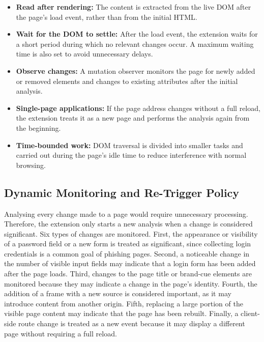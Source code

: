\documentclass{FastFyp}
\begin{document}
\begin{itemize}
    \item \textbf{Read after rendering:} The content is extracted from the live DOM after the page's load event, rather than from the initial HTML.

    \item \textbf{Wait for the DOM to settle:} After the load event, the extension waits for a short period during which no relevant changes occur. A maximum waiting time is also set to avoid unnecessary delays.

    \item \textbf{Observe changes:} A mutation observer monitors the page for newly added or removed elements and changes to existing attributes after the initial analysis.

    \item \textbf{Single-page applications:} If the page address changes without a full reload, the extension treats it as a new page and performs the analysis again from the beginning.

    \item \textbf{Time-bounded work:} DOM traversal is divided into smaller tasks and carried out during the page's idle time to reduce interference with normal browsing.
\end{itemize}

\subsection{Dynamic Monitoring and Re-Trigger Policy}
\label{sec:dynamic-trigger}

Analysing every change made to a page would require unnecessary processing. Therefore, the extension only starts a new analysis when a change is considered significant. Six types of changes are monitored. First, the appearance or visibility of a password field or a new form is treated as significant, since collecting login credentials is a common goal of phishing pages. Second, a noticeable change in the number of visible input fields may indicate that a login form has been added after the page loads. Third, changes to the page title or brand-cue elements are monitored because they may indicate a change in the page's identity. Fourth, the addition of a frame with a new source is considered important, as it may introduce content from another origin. Fifth, replacing a large portion of the visible page content may indicate that the page has been rebuilt. Finally, a client-side route change is treated as a new event because it may display a different page without requiring a full reload.
\end{document}
